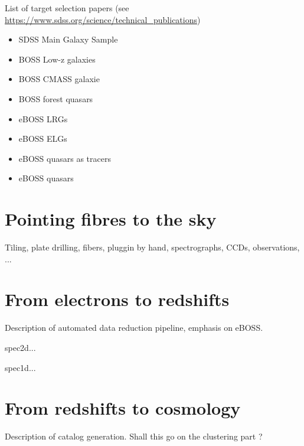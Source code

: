 List of target selection papers 
(see \url{https://www.sdss.org/science/technical_publications})

\begin{itemize}
    \item SDSS Main Galaxy Sample
    \item BOSS Low-z galaxies 
    \item BOSS CMASS galaxie 
    \item BOSS \lya forest quasars \cite{nick_ross}
    \item eBOSS LRGs \cite{}
    \item eBOSS ELGs \cite{}
    \item eBOSS quasars as tracers \cite{}
    \item eBOSS \lya quasars 
\end{itemize}

\section{Pointing fibres to the sky}
\label{spectro:fibers}

Tiling, plate drilling, fibers, pluggin by hand, 
spectrographs, CCDs, observations, ...

\section{From electrons to redshifts}
\label{spectro:pipeline}

Description of automated data reduction pipeline, 
emphasis on eBOSS. 

spec2d...

spec1d...

\section{From redshifts to cosmology}
\label{spectro:catalogs}

Description of catalog generation. Shall this go on 
the clustering part ? 

